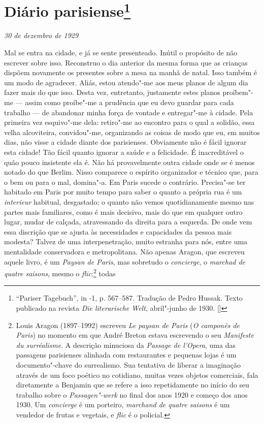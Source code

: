 \chapter{Diário parisiense\footnote[*]{``Pariser Tagebuch'', in -1, p.
  567--587. Tradução de Pedro Hussak. Texto publicado na revista \emph{Die literarische Welt}, abril"-junho de 1930. []}}

\begin{flushright}
\emph{30 de dezembro de 1929}
\end{flushright}

Mal se entra na cidade, e já se sente
presenteado. Inútil o propósito de não escrever sobre isso.
Reconstruo o dia anterior da mesma forma que as crianças dispõem
novamente os presentes sobre a mesa na manhã de natal. Isso também é um
modo de agradecer. Aliás, estou atendo"-me aos meus planos de algum dia
fazer mais do que isso. Desta vez, entretanto, justamente estes planos
proíbem"-me --- assim como proíbe"-me a prudência que eu devo guardar para
cada trabalho --- de abandonar minha força de vontade e entregar"-me à
cidade. Pela primeira vez esquivo"-me dela: retiro"-me ao encontro para o
qual a solidão, essa velha alcoviteira, convidou"-me, organizando as
coisas de modo que eu, em muitos dias, não visse a cidade diante dos
parisienses. Obviamente não é fácil ignorar esta cidade! Tão fácil quanto
ignorar a saúde e a felicidade. É inacreditável o quão pouco insistente
ela é. Não há provavelmente outra cidade onde se é menos notado
do que Berlim. Nisso comparece o espírito organizador e
técnico que, para o bem ou para o mal, domina"-a. Em Paris sucede o
contrário. Precisa"-se ter habitado em Paris por muito tempo para saber o
quanto a própria rua é um \emph{interieur} habitual, desgastado;
o quanto não vemos quotidianamente mesmo nas partes mais
familiares, como é mais decisivo, mais do que em qualquer outro lugar, mudar de
calçada, atravessando da direita para a esquerda. De onde vem essa discrição
que se ajusta às necessidades e capacidades da pessoa mais modesta?
Talvez de uma interpenetração, muito estranha para nós, entre uma
mentalidade conservadora e metropolitana. Não apenas Aragon, que
escreveu aquele livro, é um \emph{Paysan de Paris}, mas sobretudo o
\emph{concierge}, o \emph{marchad de quatre saisons}, mesmo o
\emph{flic}:\footnote{Louis Aragon (1897--1992) escreveu
  \emph{Le paysan de Paris} (\emph{O camponês de Paris}) no momento em que André Breton estava
  escrevendo o seu \emph{Manifeste du surréalisme}. A descrição
  minuciosa da \emph{Passage de l'Opera}, uma das passagens parisienses
  alinhada com restaurantes e pequenas lojas é um documento"-chave do
  surrealismo. Sua tentativa de liberar a imaginação através de um foco
  poético no cotidiano, muitas vezes objetos comerciais, fala diretamente
  a Benjamin que se refere a isso repetidamente no início do
  seu trabalho sobre o \emph{Passagen"-werk} no final dos anos 1920 e
  começo dos anos 1930. Um \emph{concierge} é um porteiro, \emph{marchand de quatre saisons} é um
  vendedor de frutas e vegetais, e \emph{flic} é o policial. \versal{[N.~O.]}} todas
